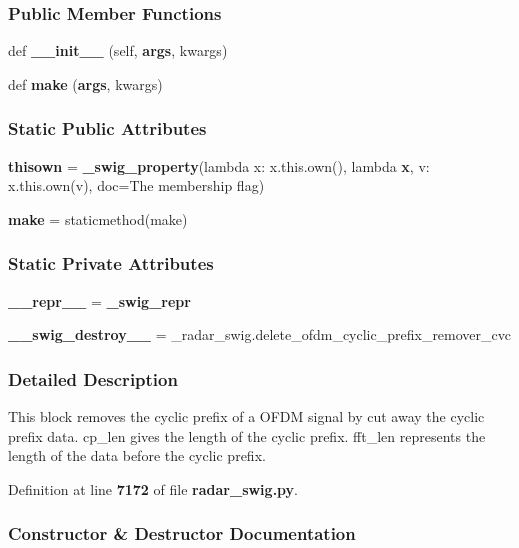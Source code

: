 \subsubsection*{Public Member Functions}
\begin{DoxyCompactItemize}
\item 
def {\bf \+\_\+\+\_\+init\+\_\+\+\_\+} (self, {\bf args}, kwargs)
\item 
def {\bf make} ({\bf args}, kwargs)
\end{DoxyCompactItemize}
\subsubsection*{Static Public Attributes}
\begin{DoxyCompactItemize}
\item 
{\bf thisown} = {\bf \+\_\+swig\+\_\+property}(lambda x\+: x.\+this.\+own(), lambda {\bf x}, v\+: x.\+this.\+own(v), doc=\textquotesingle{}The membership flag\textquotesingle{})
\item 
{\bf make} = staticmethod(make)
\end{DoxyCompactItemize}
\subsubsection*{Static Private Attributes}
\begin{DoxyCompactItemize}
\item 
{\bf \+\_\+\+\_\+repr\+\_\+\+\_\+} = {\bf \+\_\+swig\+\_\+repr}
\item 
{\bf \+\_\+\+\_\+swig\+\_\+destroy\+\_\+\+\_\+} = \+\_\+radar\+\_\+swig.\+delete\+\_\+ofdm\+\_\+cyclic\+\_\+prefix\+\_\+remover\+\_\+cvc
\end{DoxyCompactItemize}


\subsubsection{Detailed Description}
\begin{DoxyVerb}This block removes the cyclic prefix of a OFDM signal by cut away the cyclic prefix data. cp_len gives the length of the cyclic prefix. fft_len represents the length of the data before the cyclic prefix.\end{DoxyVerb}
 

Definition at line {\bf 7172} of file {\bf radar\+\_\+swig.\+py}.



\subsubsection{Constructor \& Destructor Documentation}
